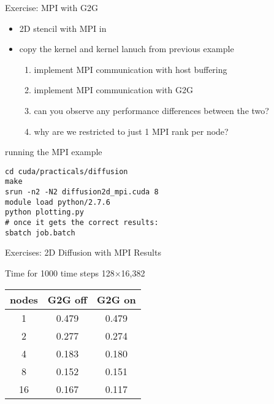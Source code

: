 \begin{frame}[fragile]{Exercise: MPI with G2G}
    \begin{itemize}
        \item 2D stencil with MPI in 
        \item copy the kernel and kernel lanuch from previous example
        \begin{enumerate}
            \item implement MPI communication with host buffering
            \item implement MPI communication with G2G
            \item can you observe any performance differences between the two?
            \item why are we restricted to just 1 MPI rank per node?
        \end{enumerate}
    \end{itemize}

    \begin{code}{running the MPI example}
        \begin{lstlisting}[style=boxcudatiny]
cd cuda/practicals/diffusion
make
srun -n2 -N2 diffusion2d_mpi.cuda 8
module load python/2.7.6
python plotting.py
# once it gets the correct results:
sbatch job.batch
        \end{lstlisting}
   \end{code}

\end{frame}

\begin{frame}[fragile]{Exercises: 2D Diffusion with MPI Results}
   \begin{info}{Time for 1000 time steps \@ 128$\times$16,382}
       \begin{center}
           \begin{tabular}{ccc}
               \hline
               nodes   &   G2G off & G2G on \\
                \hline
                1      &   0.479   & 0.479  \\
                2      &   0.277   & 0.274  \\
                4      &   0.183   & 0.180  \\
                8      &   0.152   & 0.151  \\
               16      &   0.167   & 0.117  \\
           \end{tabular}
       \end{center}
   \end{info}
\end{frame}

